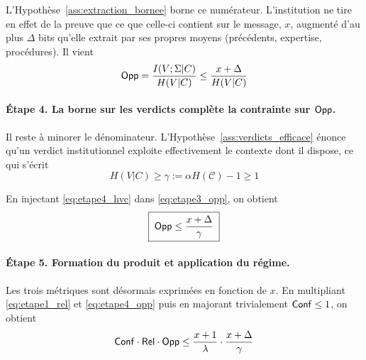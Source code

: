 \begin{sloppypar}
\begin{Preuve}
    L'Hypoth\`ese~\ref{ass:extraction_bornee} borne ce num\'erateur.
    L'institution ne tire en effet de la preuve que ce que celle-ci contient sur le
    message, $x$, augment\'e d'au plus $\Delta$ bits qu'elle extrait par ses
    propres moyens (pr\'ec\'edents, expertise, proc\'edures). Il vient
    \begin{equation}
    \mathsf{Opp} = \frac{I(V;\Sigma|C)}{H(V|C)} \leq \frac{x + \Delta}{H(V|C)}
    \label{eq:etape3_opp}
    \end{equation}

    \paragraph{\'Etape 4. La borne sur les verdicts compl\`ete la contrainte sur $\mathsf{Opp}$.}
    Il reste \`a minorer le d\'enominateur. L'Hypoth\`ese~\ref{ass:verdicts_efficace}
    \'enonce qu'un verdict institutionnel exploite effectivement le contexte
    dont il dispose, ce qui s'\'ecrit
    \begin{equation}
    H(V|C) \geq \gamma := \alpha H(\mathcal{C}) - 1 \geq 1
    \label{eq:etape4_hvc}
    \end{equation}

    En injectant \eqref{eq:etape4_hvc} dans \eqref{eq:etape3_opp}, on obtient
    \begin{equation}
    \boxed{\;\mathsf{Opp} \leq \frac{x + \Delta}{\gamma}\;}
    \label{eq:etape4_opp}
    \end{equation}

    \paragraph{\'Etape 5. Formation du produit et application du r\'egime.}
    Les trois m\'etriques sont d\'esormais exprim\'ees en fonction de $x$. En
    multipliant \eqref{eq:etape1_rel} et \eqref{eq:etape4_opp} puis en majorant
    trivialement $\mathsf{Conf} \leq 1$, on obtient
    \begin{equation}
    \mathsf{Conf} \cdot \mathsf{Rel} \cdot \mathsf{Opp} \leq \frac{x+1}{\lambda} \cdot \frac{x+\Delta}{\gamma}
    \label{eq:produit_brut}
    \end{equation}


\end{Preuve}
\end{sloppypar}
